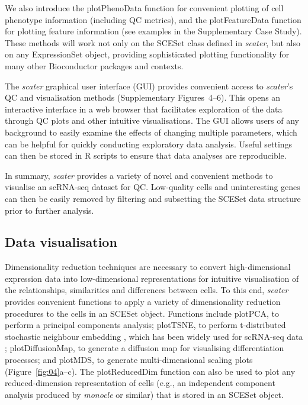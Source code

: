 \documentclass[10pt,letterpaper]{article}
\begin{document}
We also introduce the plotPhenoData function for convenient plotting of
cell phenotype information (including QC metrics), and the
plotFeatureData function for plotting feature information (see examples in the
Supplementary Case Study). These methods will work not only on the
SCESet class defined in \emph{scater}, but also on any ExpressionSet object,
providing sophisticated plotting functionality for many other Bioconductor
packages and contexts.



The \emph{scater} graphical user interface (GUI) provides convenient
access to \emph{scater}'s QC and visualisation methods (Supplementary
Figures~4--6). This opens an interactive interface in a web browser that facilitates exploration of the data through QC plots and other intuitive visualisations. The GUI allows users of any background to easily examine the effects of changing multiple parameters, which can be helpful for quickly conducting exploratory data analysis. Useful settings can then be stored in R scripts to ensure that data analyses are reproducible.

In summary, \emph{scater} provides a variety of novel and convenient
methods to visualise an scRNA-seq dataset for QC. Low-quality cells and
uninteresting genes can then be easily removed by filtering and
subsetting the SCESet data structure prior to further analysis.


\subsection*{Data visualisation}\label{data-visualisation}

Dimensionality reduction techniques are necessary to convert
high-dimensional expression data into low-dimensional representations
for intuitive visualisation of the relationships, similarities and
differences between cells. To this end, \emph{scater} provides
convenient functions to apply a variety of dimensionality reduction
procedures to the cells in an SCESet object. Functions include plotPCA,
to perform a principal components analysis; plotTSNE, to perform
t-distributed stochastic neighbour embedding \citep{Van_der_Maaten2008-oe}, which has
been widely used for scRNA-seq data \citep{Amir2013-nf,Bendall2014-gf,Macosko2015-vt};
plotDiffusionMap, to generate a diffusion map \citep{Haghverdi2015-fm} for
visualising differentiation processes; and plotMDS, to generate
multi-dimensional scaling plots (Figure~\ref{fig:04}a--c). The plotReducedDim
function can also be used to plot any reduced-dimension representation of cells
(e.g., an independent component analysis produced by \emph{monocle}
\citep{Trapnell2013-fv} or similar) that is stored in an SCESet object.
\end{document}

